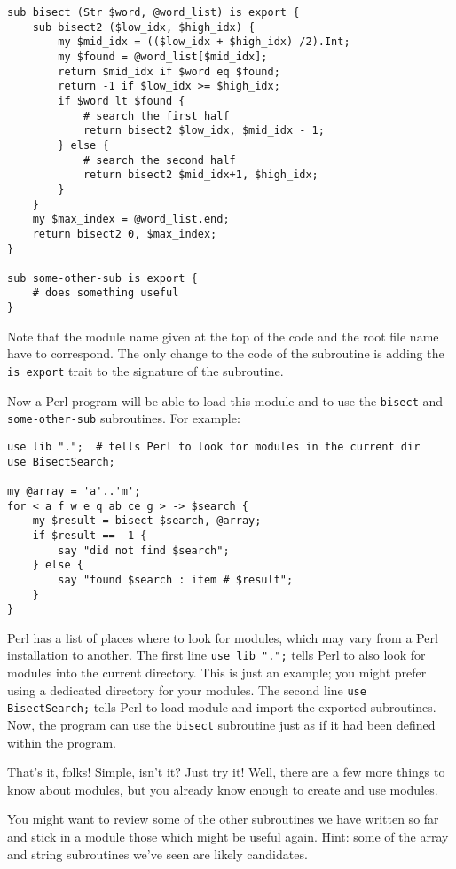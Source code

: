 {\begin{verbatim}
sub bisect (Str $word, @word_list) is export {
    sub bisect2 ($low_idx, $high_idx) {
        my $mid_idx = (($low_idx + $high_idx) /2).Int;
        my $found = @word_list[$mid_idx];
        return $mid_idx if $word eq $found;
        return -1 if $low_idx >= $high_idx;
        if $word lt $found {
            # search the first half
            return bisect2 $low_idx, $mid_idx - 1;
        } else {
            # search the second half
            return bisect2 $mid_idx+1, $high_idx;
        }
    }
    my $max_index = @word_list.end;
    return bisect2 0, $max_index;
}

sub some-other-sub is export {
    # does something useful
}
\end{verbatim}

Note that the module name given at the top of the code 
and the root file name have to correspond. The only 
change to the code of the subroutine is adding the 
{\tt is export} trait to the signature of the subroutine.

Now a Perl program will be able to load this module 
and to use the {\tt bisect} and {\tt some-other-sub} 
subroutines. For example:
\begin{verbatim}
use lib ".";  # tells Perl to look for modules in the current dir
use BisectSearch;

my @array = 'a'..'m';
for < a f w e q ab ce g > -> $search { 
    my $result = bisect $search, @array;
    if $result == -1 {
        say "did not find $search";
    } else {
        say "found $search : item # $result";
    }
}
\end{verbatim}
%

Perl has a list of places where to look for modules, 
which may vary from a Perl installation to another. 
The first line {\tt use lib ".";} tells Perl to also 
look for modules into the current directory. This is 
just an example; you might prefer using a dedicated 
directory for your modules. The 
second line {\tt use BisectSearch;} tells Perl to 
load module and import the exported subroutines. Now, 
the program can use the {\tt bisect} subroutine just as if 
it had been defined within the program.

That's it, folks! Simple, isn't it? Just try it! Well, there 
are a few more things to know about modules, but you 
already know enough to create and use modules. 

You might want to review some of the other subroutines we 
have written so far and stick in a module those which 
might be useful again. Hint: some of the array and string 
subroutines we've seen are likely candidates.

}
